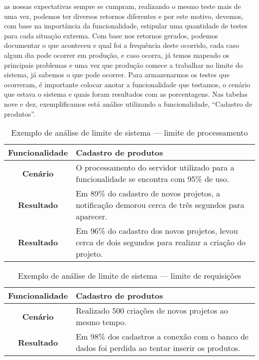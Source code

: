       as nossas expectativas sempre se cumpram, realizando o mesmo teste mais de
      uma vez, podemos ter diversos retornos diferentes e por este motivo, devemos,
      com base na importância da funcionalidade, estipular uma quantidade de testes
      para cada situação extrema. Com base nos retornos gerados, podemos documentar
      o que aconteceu e qual foi a frequência deste ocorrido, cada caso algum dia
      pode ocorrer em produção, e caso ocorra, já temos mapeado os principais
      problemas e uma vez que produção comece a trabalhar no limite do sistema,
      já sabemos o que pode ocorrer. Para armazenarmos os testes que ocorreram,
      é importante colocar anotar a funcionalidade que testamos, o cenário que
      estava o sistema e quais foram resultados com as porcentagens. Nas tabelas
      nove e dez, exemplificamos está análise utilizando a funcionalidade,
      “Cadastro de produtos”. \newline

      \begin{table}[h!]
        \centering
        \begin{tabular}{|c|p{10cm}|}
          \hline
          \textbf{Funcionalidade} &
          Cadastro de produtos \\ \hline
          \textbf{Cenário} &
          O processamento do servidor utilizado para a funcionalidade se encontra
          com 95\% de uso. \\ \hline
          \textbf{Resultado} &
          Em 89\% do cadastro de novos projetos, a notificação demorou cerca de
          três segundos para aparecer. \\ \hline
          \textbf{Resultado} &
          Em 96\% do cadastro dos novos projetos, levou cerca de dois
          segundos para realizar a criação do projeto. \\ \hline
        \end{tabular}
        \caption{Exemplo de análise de limite de sistema — limite de processamento}
        \label{Tabela:9}
      \end{table}

      \begin{table}[h!]
        \centering
        \begin{tabular}{|c|p{10cm}|}
          \hline
          \textbf{Funcionalidade} &
          Cadastro de produtos \\ \hline
          \textbf{Cenário} &
          Realizado 500 criações de novos projetos ao mesmo tempo. \\ \hline
          \textbf{Resultado} &
          Em 98\% dos cadastros a conexão com o banco de dados foi perdida ao tentar
          inserir os produtos. \\ \hline
        \end{tabular}
        \caption{Exemplo de análise de limite de sistema — limite de requisições}
        \label{Tabela:10}
      \end{table}

